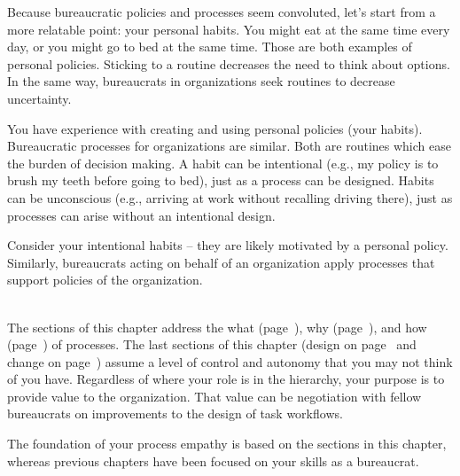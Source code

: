 
Because bureaucratic policies and processes seem convoluted, let's start from a more relatable point: your personal habits.
You might eat at the same time every day, or you might go to bed at the same time. Those are both examples of personal policies. Sticking to a routine decreases the need to think about options. In the same way, bureaucrats in organizations seek routines to decrease uncertainty. 

You have experience with creating and using personal policies (your habits).  Bureaucratic processes for organizations are similar.
Both are routines which ease the burden of decision making. A habit can be intentional (e.g., my policy is to brush my teeth before going to bed), just as a process can be designed. Habits can be unconscious (e.g., arriving at work without recalling driving there), just as processes can arise without an intentional design. 

Consider your intentional habits -- they are likely motivated by a personal policy. Similarly, bureaucrats acting on behalf of an organization apply processes that support policies of the organization.

\ \\

The sections of this chapter address the what (page~\pageref{sec:definition-of-process}), why (page~\pageref{sec:why-processes-exist}), and how (page~\pageref{sec:process-chaos}) of processes. 
The last sections of this chapter (design on page~\pageref{sec:design-of-processes} and change on page~\pageref{sec:change-a-process}) assume a level of control and autonomy that you may not think of you have. Regardless of where your role is in the hierarchy, your purpose is to provide value to the organization. That value can be negotiation with fellow bureaucrats on improvements to the design of task workflows. 

The foundation of your \gls{process empathy} is based on the sections in this chapter, whereas previous chapters have been focused on your skills as a bureaucrat. 